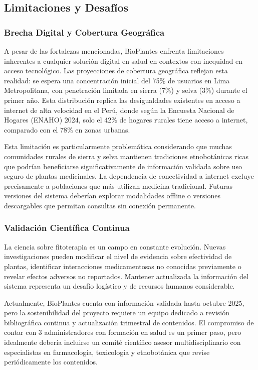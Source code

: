 \documentclass[12pt,a4paper]{article}
\begin{document}
\subsection{Limitaciones y Desafíos}

\subsubsection{Brecha Digital y Cobertura Geográfica}

A pesar de las fortalezas mencionadas, BioPlantes enfrenta limitaciones inherentes a cualquier solución digital en salud en contextos con inequidad en acceso tecnológico. Las proyecciones de cobertura geográfica reflejan esta realidad: se espera una concentración inicial del 75\% de usuarios en Lima Metropolitana, con penetración limitada en sierra (7\%) y selva (3\%) durante el primer año. Esta distribución replica las desigualdades existentes en acceso a internet de alta velocidad en el Perú, donde según la Encuesta Nacional de Hogares (ENAHO) 2024, solo el 42\% de hogares rurales tiene acceso a internet, comparado con el 78\% en zonas urbanas.

Esta limitación es particularmente problemática considerando que muchas comunidades rurales de sierra y selva mantienen tradiciones etnobotánicas ricas que podrían beneficiarse significativamente de información validada sobre uso seguro de plantas medicinales. La dependencia de conectividad a internet excluye precisamente a poblaciones que más utilizan medicina tradicional. Futuras versiones del sistema deberían explorar modalidades offline o versiones descargables que permitan consultas sin conexión permanente.

\subsubsection{Validación Científica Continua}

La ciencia sobre fitoterapia es un campo en constante evolución. Nuevas investigaciones pueden modificar el nivel de evidencia sobre efectividad de plantas, identificar interacciones medicamentosas no conocidas previamente o revelar efectos adversos no reportados. Mantener actualizada la información del sistema representa un desafío logístico y de recursos humanos considerable.

Actualmente, BioPlantes cuenta con información validada hasta octubre 2025, pero la sostenibilidad del proyecto requiere un equipo dedicado a revisión bibliográfica continua y actualización trimestral de contenidos. El compromiso de contar con 3 administradores con formación en salud es un primer paso, pero idealmente debería incluirse un comité científico asesor multidisciplinario con especialistas en farmacología, toxicología y etnobotánica que revise periódicamente los contenidos.
\end{document}
